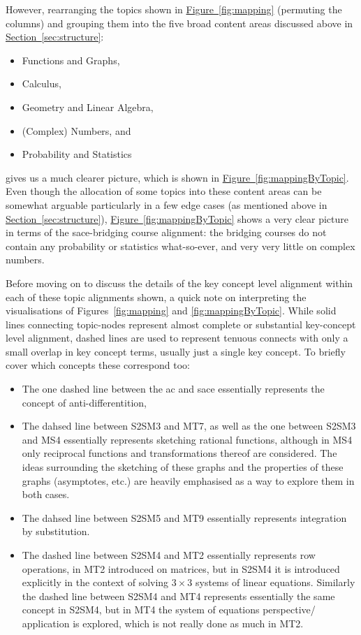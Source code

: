 \documentclass[twoside,12pt,a4paper]{report}
\newcommand{\refsec}[1]{\hyperref[sec:#1]{Section~\ref{sec:#1}}}
\newcommand{\reffig}[1]{\hyperref[fig:#1]{Figure~\ref{fig:#1}}}
\begin{document}
However, rearranging the topics shown in \reffig{mapping} (permuting the columns) and grouping them into the five broad content areas discussed above in \refsec{structure}: 
\begin{itemize}
	\item Functions and Graphs, 
	\item Calculus, 
	\item Geometry and Linear Algebra, 
	\item (Complex) Numbers, and 
	\item Probability and Statistics	
\end{itemize}
gives us a much clearer picture, which is shown in \reffig{mappingByTopic}. Even though the allocation of some topics into these content areas can be somewhat arguable particularly in a few edge cases (as mentioned above in \refsec{structure}), \reffig{mappingByTopic} shows a very clear picture in terms of the \gls{sace}-bridging course alignment: the bridging courses do not contain any probability or statistics what-so-ever, and very very little on complex numbers. 

Before moving on to discuss the details of the key concept level alignment within each of these topic alignments shown, a quick note on interpreting the visualisations of Figures~\ref{fig:mapping} and \ref{fig:mappingByTopic}. While solid lines connecting topic-nodes represent almost complete or substantial key-concept level alignment, dashed lines are used to represent tenuous connects with only a small overlap in key concept terms, usually just a single key concept. To briefly cover which concepts these correspond too:
\begin{itemize}
	\item The one dashed line between the \gls{ac} and \gls{sace} essentially represents the concept of anti-differentition,
	\item The dahsed line between S2SM3 and MT7, as well as the one between S2SM3 and MS4 essentially represents sketching rational functions, although in MS4 only reciprocal functions and transformations thereof are considered. The ideas surrounding the sketching of these graphs and the properties of these graphs (asymptotes, etc.) are heavily emphasised as a way to explore them in both cases.
	\item The dahsed line between S2SM5 and MT9 essentially represents integration by substitution.
	\item The dashed line between S2SM4 and MT2 essentially represents row operations, in MT2 introduced on matrices, but in S2SM4 it is introduced explicitly in the context of solving $3 \times 3$ systems of linear equations. Similarly the dashed line between S2SM4 and MT4 represents essentially the same concept in S2SM4, but in MT4 the system of equations perspective/ application is explored, which is not really done as much in MT2.
\end{itemize}
\end{document}
